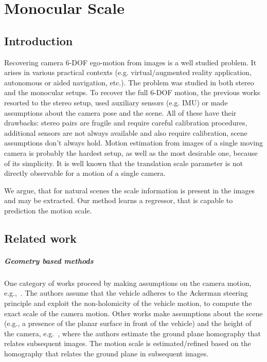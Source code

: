 \chapter{Monocular Scale}

\section{Introduction}

Recovering camera 6-DOF ego-motion from images is a well studied
problem. It arises in various practical contexts
(e.g. virtual/augmented reality application, autonomous or aided
navigation, etc.).  The problem was studied in both stereo and the
monocular setups.  To recover the full 6-DOF motion, the previous
works resorted to the stereo setup, used auxiliary sensors (e.g. IMU)
or made assumptions about the camera pose and the scene.  All of these
have their drawbacks: stereo pairs are fragile and require careful
calibration procedures, additional sensors are not always available
and also require calibration, scene assumptions don't always hold.
Motion estimation from images of a single moving camera is probably
the hardest setup, as well as the most desirable one, because of its
simplicity.  It is well known that the translation scale parameter is
not directly observable for a motion of a single camera.

We argue, that for natural scenes the scale information is present in
the images and may be extracted.  Our method learns a regressor, that
is capable to prediction the motion scale.

\section{Related work}
\paragraph{Geometry based methods} One category of works proceed by
making assumptions on the camera motion,
e.g.,~\cite{scaramuzza2009absolute}.  The authors assume that the
vehicle adheres to the Ackerman steering principle and exploit the
non-holomicity of the vehicle motion, to compute the exact scale of
the camera motion.  Other works make assumptions about the scene
(e.g., a presence of the planar surface in front of the vehicle) and
the height of the camera, e.g.~\cite{zhou2016reliable}, where the
authors estimate the ground plane homography that relates subsequent
images.  The motion scale is estimated/refined based on the homography
that relates the ground plane in subsequent images.

